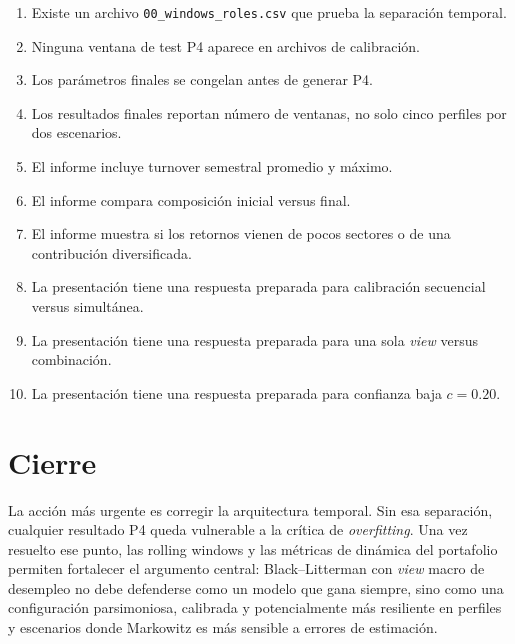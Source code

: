 \documentclass[11pt]{article}
\begin{document}
\begin{enumerate}[label=\arabic*.]
    \item Existe un archivo \texttt{00\_windows\_roles.csv} que prueba la separaci\'on temporal.
    \item Ninguna ventana de test P4 aparece en archivos de calibraci\'on.
    \item Los par\'ametros finales se congelan antes de generar P4.
    \item Los resultados finales reportan n\'umero de ventanas, no solo cinco perfiles por dos escenarios.
    \item El informe incluye turnover semestral promedio y m\'aximo.
    \item El informe compara composici\'on inicial versus final.
    \item El informe muestra si los retornos vienen de pocos sectores o de una contribuci\'on diversificada.
    \item La presentación tiene una respuesta preparada para calibración secuencial versus simultánea.
    \item La presentación tiene una respuesta preparada para una sola \textit{view} versus combinación.
    \item La presentación tiene una respuesta preparada para confianza baja $c=0.20$.
\end{enumerate}

\section{Cierre}

La acci\'on m\'as urgente es corregir la arquitectura temporal. Sin esa separaci\'on, cualquier resultado P4 queda vulnerable a la cr\'itica de \textit{overfitting}. Una vez resuelto ese punto, las rolling windows y las m\'etricas de din\'amica del portafolio permiten fortalecer el argumento central: Black--Litterman con \textit{view} macro de desempleo no debe defenderse como un modelo que gana siempre, sino como una configuraci\'on parsimoniosa, calibrada y potencialmente m\'as resiliente en perfiles y escenarios donde Markowitz es m\'as sensible a errores de estimaci\'on.
\end{document}
